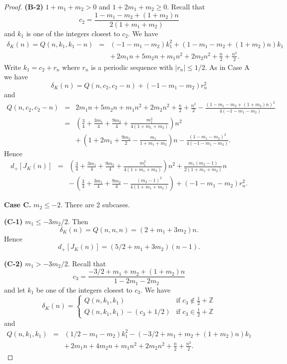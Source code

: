 \documentclass[11pt]{amsart}
\numberwithin{equation}{section}
\theoremstyle{plain}
\theoremstyle{definition}
\def\BZ{\mathbb Z}
\begin{document}
\begin{proof}
\textbf{(B-2)} $1 + m_1 + m_2 > 0$ and $1 + 2m_1 + m_2 \ge 0$. Recall that $$c_2=\frac{1 - m_1 - m_2 + (1 + m_2) n}{2 (1 + m_1 + m_2)}$$
and $k_1$ is one of the integers closest to $c_2$. We have 
\begin{eqnarray*}
\delta_K(n) = Q(n,k_1,k_1-n)
&=& (-1-m_1-m_2) k_1^2 + ( 1 - m_1 - m_2 + (1 + m_2) n) k_1 \\
&& + \, 2 m_1 n + 5 m_2 n  + m_1 n^2 + 2 m_2 n^2 + \frac{n}{2} + \frac{n^2}{2}.
\end{eqnarray*}
Write $k_1 = c_2 + r_n$ where $r_n$ is a periodic sequence with $|r_n| \le 1/2$.  As in Case A we have 
$$\delta_K(n) = Q(n,c_2,c_2-n) + (-1-m_1-m_2)r_n^2$$
and
\begin{eqnarray*}
Q(n,c_2,c_2-n) &=&  2 m_1 n + 5 m_2 n  + m_1 n^2 + 2 m_2 n^2 + \frac{n}{2} + \frac{n^2}{2} - \frac{( 1 - m_1 - m_2 + (1 + m_2) n)^2}{4(-1-m_1-m_2)} \\
&=& \left( \frac{3}{4} + \frac{3m_1}{4} + \frac{9m_2}{4} +  \frac{m_1^2}{4(1 + m_1 + m_2)} \right) n^2  \\
&& + \,  \left( 1 + 2m_1 + \frac{9m_2}{2}  - \frac{m_1}{1 + m_1 + m_2} \right) n - \frac{( 1 - m_1 - m_2)^2}{4(-1-m_1-m_2)}.
\end{eqnarray*} 
Hence 
\begin{eqnarray*}
d_+[J_K(n)] &=& \left( \frac{3}{4} + \frac{3m_1}{4} + \frac{9m_2}{4} +  \frac{m_1^2}{4(1 + m_1 + m_2)} \right) n^2 + \frac{m_1(m_2-1)}{2(1+m_1+m_2)} n\\
&& - \,  \left( \frac{3}{4} + \frac{3m_1}{4} + \frac{9m_2}{4} - \frac{(m_2 - 1)^2}{4(1 + m_1 + m_2)}\right) + (-1-m_1-m_2)r_n^2.
\end{eqnarray*}

\textbf{Case C.} $m_2 \le -2$. There are 2 subcases.

\textbf{(C-1)} $m_1 \le -3m_2/2$. Then 
$$\delta_K(n) = Q(n,n,n)=(2 + m_1 + 3 m_2) n.$$
Hence $$d_+[J_K(n)] = (5/2 + m_1 + 3 m_2) (n-1).$$ 

\textbf{(C-2)} $m_1 > -3m_2/2$. Recall that $$c_3=\frac{-3/2 + m_1 + m_2 + (1+m_2 ) n}{1-2m_1-2m_2}$$
and let $k_1$ be one of the integers closest to $c_3$. We have
$$\delta_K(n) = \begin{cases} Q(n,k_1,k_1) &\mbox{if } c_3 \notin \frac{1}{2} + \BZ \\ 
Q(n,k_1,k_1)-(c_3 + 1/2) & \mbox{if } c_3 \in \frac{1}{2} + \BZ \end{cases}$$
and
\begin{eqnarray*}
Q(n,k_1,k_1)
&=& \left( 1/2-m_1-m_2 \right) k_1^2 - \left( -3/2 + m_1 + m_2 + (1+m_2 ) n \right) k_1 \\
&& + \, 2 m_1 n + 4 m_2 n  + m_1 n^2 + 2 m_2 n^2 + \frac{n}{2} + \frac{n^2}{2}.
\end{eqnarray*}


\end{proof}
\end{document}

